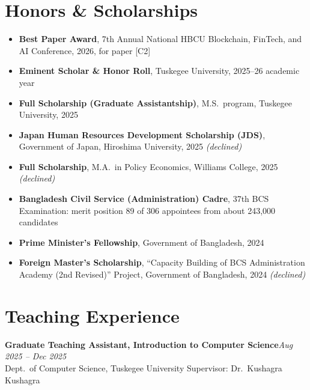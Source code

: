 \documentclass[10pt,letterpaper]{article}
\newcommand{\position}[3]{%
  \textbf{#1}\hfill{\color{muted}\textit{#2}}\\
  {\color{dark}#3}\par\vspace{1pt}}
\begin{document}
\section{Honors \& Scholarships}
\begin{itemize}
  \item \textbf{Best Paper Award}, 7th Annual National HBCU Blockchain, FinTech, and AI Conference, 2026, for paper [C2]
  \item \textbf{Eminent Scholar \& Honor Roll}, Tuskegee University, 2025--26 academic year
  \item \textbf{Full Scholarship (Graduate Assistantship)}, M.S.\ program, Tuskegee University, 2025
  \item \textbf{Japan Human Resources Development Scholarship (JDS)}, Government of Japan, Hiroshima University,
  2025 \textit{(declined)}
  \item \textbf{Full Scholarship}, M.A.\ in Policy Economics, Williams College, 2025 \textit{(declined)}
  \item \textbf{Bangladesh Civil Service (Administration) Cadre}, 37th BCS Examination: merit position 89 of 306 appointees
  from about 243,000 candidates
  \item \textbf{Prime Minister's Fellowship}, Government of Bangladesh, 2024
  \item \textbf{Foreign Master's Scholarship}, ``Capacity Building of BCS Administration Academy (2nd Revised)''
  Project, Government of Bangladesh, 2024 \textit{(declined)}
\end{itemize}

\section{Teaching Experience}
\position{Graduate Teaching Assistant, Introduction to Computer Science}{Aug 2025 -- Dec 2025}
{Dept.\ of Computer Science, Tuskegee University \quad\textbullet\quad Supervisor: Dr.\ Kushagra Kushagra}

\end{document}
